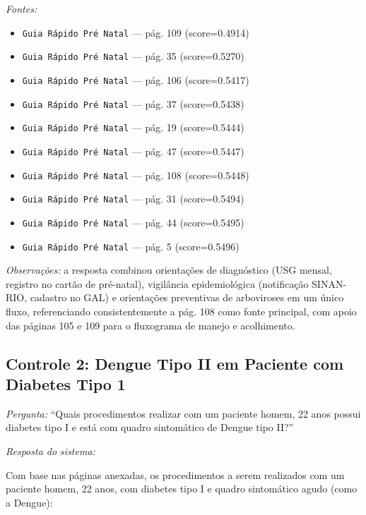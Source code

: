 \documentclass[conference,a4paper]{IEEEtran}
\begin{document}
\textit{Fontes:}
\begin{itemize}
  \item \texttt{Guia Rápido Pré Natal} --- pág. 109 (score=0.4914)
  \item \texttt{Guia Rápido Pré Natal} --- pág. 35 (score=0.5270)
  \item \texttt{Guia Rápido Pré Natal} --- pág. 106 (score=0.5417)
  \item \texttt{Guia Rápido Pré Natal} --- pág. 37 (score=0.5438)
  \item \texttt{Guia Rápido Pré Natal} --- pág. 19 (score=0.5444)
  \item \texttt{Guia Rápido Pré Natal} --- pág. 47 (score=0.5447)
  \item \texttt{Guia Rápido Pré Natal} --- pág. 108 (score=0.5448)
  \item \texttt{Guia Rápido Pré Natal} --- pág. 31 (score=0.5494)
  \item \texttt{Guia Rápido Pré Natal} --- pág. 44 (score=0.5495)
  \item \texttt{Guia Rápido Pré Natal} --- pág. 5 (score=0.5496)
\end{itemize}

\medskip
\noindent\textit{Observações:} a resposta combinou orientações de
diagnóstico (USG mensal, registro no cartão de pré-natal),
vigilância epidemiológica (notificação SINAN-RIO, cadastro no
GAL) e orientações preventivas de arboviroses em um único fluxo,
referenciando consistentemente a pág. 108 como fonte principal,
com apoio das páginas 105 e 109 para o fluxograma de manejo e
acolhimento.

\subsection{Controle 2: Dengue Tipo II em Paciente com Diabetes Tipo 1}

\noindent\textit{Pergunta:} ``Quais procedimentos realizar com um
paciente homem, 22 anos possui diabetes tipo I e está com quadro
sintomático de Dengue tipo II?''

\medskip
\noindent\textit{Resposta do sistema:}

Com base nas páginas anexadas, os procedimentos a serem
realizados com um paciente homem, 22 anos, com diabetes tipo I e
quadro sintomático agudo (como a Dengue):
\end{document}
